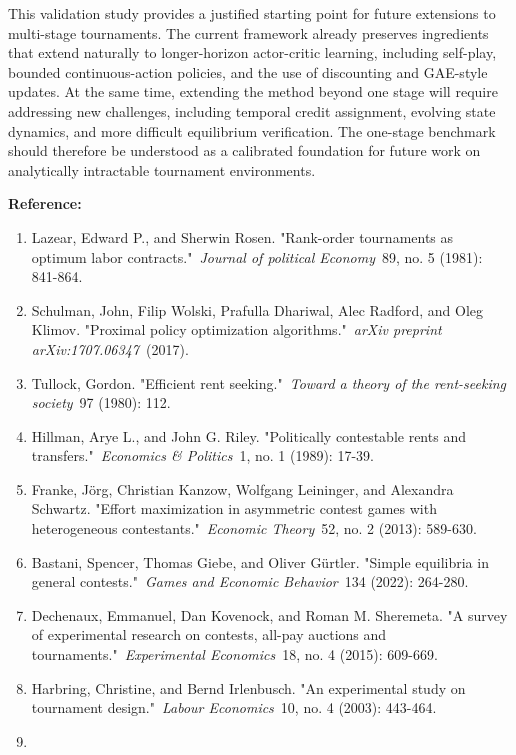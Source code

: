 \documentclass[
]{article}
\begin{document}
This validation study provides a justified starting point for future
extensions to multi-stage tournaments. The current framework already
preserves ingredients that extend naturally to longer-horizon
actor-critic learning, including self-play, bounded continuous-action
policies, and the use of discounting and GAE-style updates. At the same
time, extending the method beyond one stage will require addressing new
challenges, including temporal credit assignment, evolving state
dynamics, and more difficult equilibrium verification. The one-stage
benchmark should therefore be understood as a calibrated foundation for
future work on analytically intractable tournament environments.

\textbf{Reference:}

\begin{enumerate}
\def\labelenumi{\arabic{enumi}.}
\item
  Lazear, Edward P., and Sherwin Rosen. "Rank-order tournaments as
  optimum labor contracts."~\emph{Journal of political Economy}~89, no.
  5 (1981): 841-864.
\item
  Schulman, John, Filip Wolski, Prafulla Dhariwal, Alec Radford, and
  Oleg Klimov. "Proximal policy optimization algorithms."~\emph{arXiv
  preprint arXiv:1707.06347}~(2017).
\item
  Tullock, Gordon. "Efficient rent seeking."~\emph{Toward a theory of
  the rent-seeking society}~97 (1980): 112.
\item
  Hillman, Arye L., and John G. Riley. "Politically contestable rents
  and transfers."~\emph{Economics \& Politics}~1, no. 1 (1989): 17-39.
\item
  Franke, Jörg, Christian Kanzow, Wolfgang Leininger, and Alexandra
  Schwartz. "Effort maximization in asymmetric contest games with
  heterogeneous contestants."~\emph{Economic Theory}~52, no. 2 (2013):
  589-630.
\item
  Bastani, Spencer, Thomas Giebe, and Oliver Gürtler. "Simple equilibria
  in general contests."~\emph{Games and Economic Behavior}~134 (2022):
  264-280.
\item
  Dechenaux, Emmanuel, Dan Kovenock, and Roman M. Sheremeta. "A survey
  of experimental research on contests, all-pay auctions and
  tournaments."~\emph{Experimental Economics}~18, no. 4 (2015): 609-669.
\item
  Harbring, Christine, and Bernd Irlenbusch. "An experimental study on
  tournament design."~\emph{Labour Economics}~10, no. 4 (2003): 443-464.
\item

\end{enumerate}
\end{document}
